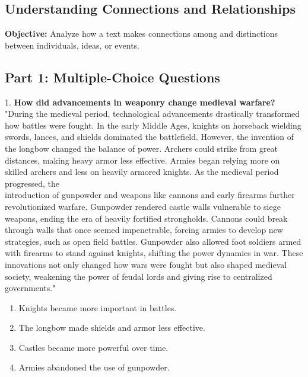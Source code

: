 \documentclass[12pt]{article}
\begin{document}
\subsection*{Understanding Connections and Relationships}
\onehalfspacing

\begin{tcolorbox}[colframe=black!40, colback=gray!0, title=Learning Objective]
\textbf{Objective:} Analyze how a text makes connections among and distinctions between individuals, ideas, or events.
\end{tcolorbox}

\subsection*{Part 1: Multiple-Choice Questions}

1. \textbf{How did advancements in weaponry change medieval warfare?\\}
"During the medieval period, technological advancements drastically transformed how battles were fought. In the early Middle Ages, knights on horseback wielding swords, lances, and shields dominated the battlefield. However, the invention of the longbow changed the balance of power. Archers could strike from great distances, making heavy armor less effective. Armies began relying more on skilled archers and less on heavily armored knights. As the medieval period progressed, the \\introduction of gunpowder and weapons like cannons and early firearms further revolutionized warfare. Gunpowder rendered castle walls vulnerable to siege \\weapons, ending the era of heavily fortified strongholds. Cannons could break \\through walls that once seemed impenetrable, forcing armies to develop new \\strategies, such as open field battles. Gunpowder also allowed foot soldiers armed with firearms to stand against knights, shifting the power dynamics in war. These innovations not only changed how wars were fought but also shaped medieval \\society, weakening the power of feudal lords and giving rise to centralized \\governments."\\
\begin{enumerate}[label=\Alph*.]
    \item Knights became more important in battles.  
    \item The longbow made shields and armor less effective.  
    \item Castles became more powerful over time.  
    \item Armies abandoned the use of gunpowder.  
\end{enumerate}
\end{document}
